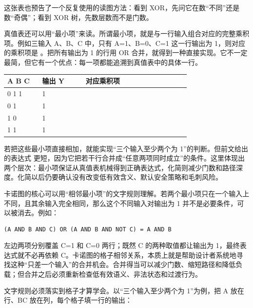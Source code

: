 这张表也预告了一个反复使用的读图方法：看到 XOR，先问它在数“不同”还是数“奇偶”；看到 XOR 树，先数层数而不是门数。

真值表还可以用“最小项”来读。所谓最小项，就是与一行输入组合对应的完整乘积项。例如三输入 A、B、C 中，只有 A=1、B=0、C=1 这一行输出为 1，则对应的乘积项是 。把所有输出为 1 的行用 OR 合并，就得到一种直接实现。它不一定最简，但它有一个优点：每一项都能追溯到真值表中的具体一行。

\begin{longtable}{L{0.16\linewidth}L{0.2\linewidth}L{0.48\linewidth}}
\toprule
A B C & 输出 Y & 对应乘积项 \\
 1 1 & 1 &  \\ 0 1 & 1 &  \\ 1 0 & 1 &  \\ 1 1 & 1 &  \\
\bottomrule
\end{longtable}

若把这些最小项直接相加，就能实现“三个输入至少两个为 1”的判断。但前文给出的表达式  更短，因为它把若干行合并成“任意两项同时成立”的条件。这里体现出两个层次：最小项保证从真值表机械得到正确表达式，化简则减少门数和路径深度。化简以后仍要确认没有改变低有效含义、默认安全策略和毛刺风险。

卡诺图的核心可以用“相邻最小项”的文字规则理解。若两个最小项只在一个输入上不同，且其余输入完全相同，那么这个不同输入对输出为 1 并不是必要条件，可以被消去。例如：

\begin{lstlisting}
(A AND B AND C) OR (A AND B AND NOT C) = A AND B
\end{lstlisting}

左边两项分别覆盖 C=1 和 C=0 两行；既然 C 的两种取值都让输出为 1，最终表达式就不必再依赖 C。卡诺图的格子相邻关系，本质上就是帮助设计者系统地寻找这种“只差一个输入”的合并机会。合并得当可以减少门数、缩短路径和降低负载；但合并之后必须重新检查低有效语义、非法状态和过渡行为。

文字规则必须落实到格子才算学会。以“三个输入至少两个为 1”为例，把 A 放在行、BC 放在列，每个格子填一行的输出：

